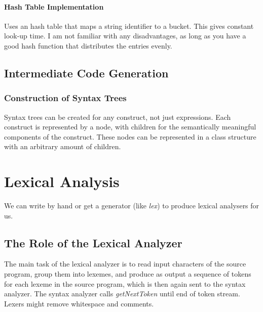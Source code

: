 \documentclass{article}
\begin{document}
\paragraph{Hash Table Implementation}
Uses an hash table that maps a string identifier to a bucket. This gives constant look-up time. I am not familiar with any disadvantages, as long as you have a good hash function that distributes the entries evenly.




\subsection{Intermediate Code Generation} %
\label{sub:Intermediate Code Generation}

\subsubsection{Construction of Syntax Trees} %
\label{ssub:Construction of Syntax Trees}
Syntax trees can be created for any construct, not just expressions. Each construct is represented by a node, with children for the semantically meaningful components of the construct. These nodes can be represented in a class structure with an arbitrary amount of children.



\section{Lexical Analysis} %
\label{sec:Lexical Analysis}
We can write by hand or get a generator (like \emph{lex}) to produce lexical analysers for us.

\subsection{The Role of the Lexical Analyzer} %
\label{sub:The Role of the Lexical Analyzer}
The main task of the lexical analyzer is to read input characters of the source program, group them into lexemes, and produce as output a sequence of tokens for each lexeme in the source program, which is then again sent to the syntax analyzer. The syntax analyzer calls \emph{getNextToken} until end of token stream. Lexers might remove whitespace and comments.
\end{document}
